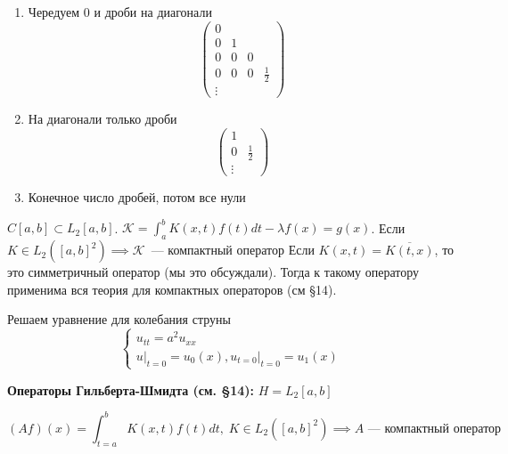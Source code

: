 \begin{example}  %
    \begin{enumerate}
        \item[1a] Чередуем 0 и дроби на диагонали
        $$
        \begin{pmatrix}
            0 \\
            0 & 1 \\
            0 & 0 & 0 \\
            0 & 0 & 0 & \frac{1}{2} \\
            \vdots
        \end{pmatrix}
        $$
        \item[1b] На диагонали только дроби
        $$
        \begin{pmatrix}
            1 \\
            0 & \frac{1}{2} \\
            \vdots
        \end{pmatrix}
        $$
        \item[2] Конечное число дробей, потом все нули
    \end{enumerate}
\end{example}

\begin{lemmanote}
    $C[a,b] \subset L_2[a,b]$. $\mathcal{K}=\int_a^b K(x,t)f(t)dt - \lambda f(x)=g(x)$. Если $K \in L_2([a,b]^2) \implies \mathcal{K}$~--- компактный оператор
    Если $K(x, t) = \overline{K(t, x)}$, то это симметричный оператор (мы это обсуждали).
    Тогда к такому оператору применима вся теория для компактных операторов (см §14).
\end{lemmanote}

\begin{example}
    Решаем уравнение для колебания струны
    $$
    \begin{cases}
        u_{tt} = a^2 u_{xx}\\
        \left. u \right|_{t = 0} = u_0(x),
        \left. u_{t = 0} \right|_{t = 0} = u_1(x)
    \end{cases}
    $$
\end{example}

\textbf{Операторы Гильберта-Шмидта (см. §14):}
$H = L_2[a, b]$

\[ (
Af)(x) = \int_{t=a}^b K(x,t)f(t)dt, \; K \in L_2([a,b]^2) \implies A \text{~--- компактный оператор} 
\]











